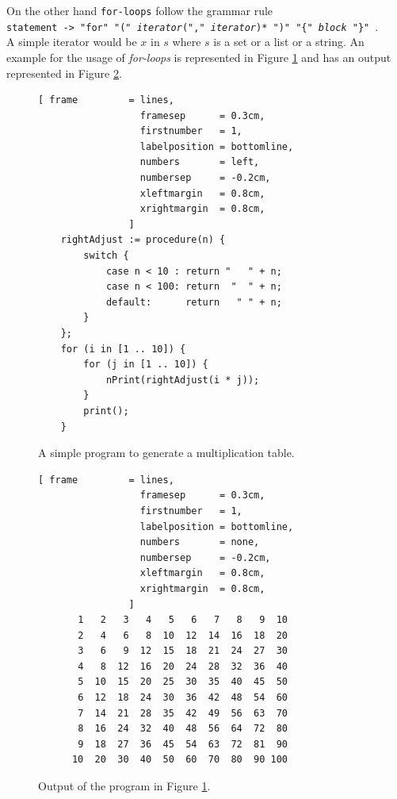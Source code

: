 \documentclass[11pt]{report}
\begin{document}
On the other hand \texttt{for-loops} follow the grammar rule
\\[0.2cm]
\hspace*{1.3cm}
\texttt{statement -> "for" "(" \textsl{iterator}("," \textsl{iterator})* ")" "\{" \textsl{block} "\}" }.
\\[0.2cm]
A simple iterator would be $x$ in $s$ where $s$ is a set or a list or a string. An example for the usage of \textsl{for-loops} is represented in Figure \ref{fig:multiplication-table.stlx} and has an output represented in Figure \ref{fig:multiplication-table}.
\begin{figure}[!ht]
\centering
\begin{Verbatim}[ frame         = lines, 
                  framesep      = 0.3cm, 
                  firstnumber   = 1,
                  labelposition = bottomline,
                  numbers       = left,
                  numbersep     = -0.2cm,
                  xleftmargin   = 0.8cm,
                  xrightmargin  = 0.8cm,
                ]
    rightAdjust := procedure(n) {
        switch {
            case n < 10 : return "   " + n;
            case n < 100: return  "  " + n;
            default:      return   " " + n;
        }
    };      
    for (i in [1 .. 10]) {
        for (j in [1 .. 10]) {
            nPrint(rightAdjust(i * j));
        }
        print();
    }
\end{Verbatim}
\vspace*{-0.3cm}
\caption{A simple program to generate a multiplication table.}
\label{fig:multiplication-table.stlx}
\end{figure}

\begin{figure}[!ht]
\centering
\begin{Verbatim}[ frame         = lines, 
                  framesep      = 0.3cm, 
                  firstnumber   = 1,
                  labelposition = bottomline,
                  numbers       = none,
                  numbersep     = -0.2cm,
                  xleftmargin   = 0.8cm,
                  xrightmargin  = 0.8cm,
                ]
       1   2   3   4   5   6   7   8   9  10
       2   4   6   8  10  12  14  16  18  20
       3   6   9  12  15  18  21  24  27  30
       4   8  12  16  20  24  28  32  36  40
       5  10  15  20  25  30  35  40  45  50
       6  12  18  24  30  36  42  48  54  60
       7  14  21  28  35  42  49  56  63  70
       8  16  24  32  40  48  56  64  72  80
       9  18  27  36  45  54  63  72  81  90
      10  20  30  40  50  60  70  80  90 100
\end{Verbatim}
\vspace*{-0.3cm}
\caption{Output of the program in Figure \ref{fig:multiplication-table.stlx}.}
\label{fig:multiplication-table}
\end{figure}
\pagebreak
\end{document}
